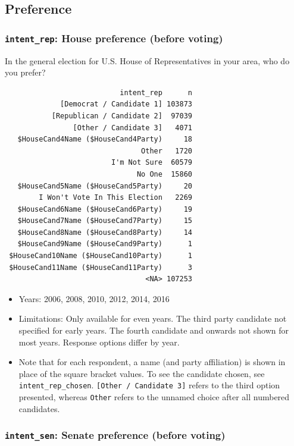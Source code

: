 \documentclass[10pt,article,oneside]{memoir}
\theoremstyle{definition}
\begin{document}
\subsection{Preference}\label{preference}

\subsubsection{\texorpdfstring{\texttt{intent\_rep}: House preference
(before
voting)}{intent\_rep: House preference (before voting)}}\label{intent_rep-house-preference-before-voting}

In the general election for U.S. House of Representatives in your area,
who do you prefer?

\begin{verbatim}
                           intent_rep      n
             [Democrat / Candidate 1] 103873
           [Republican / Candidate 2]  97039
                [Other / Candidate 3]   4071
   $HouseCand4Name ($HouseCand4Party)     18
                                Other   1720
                         I'm Not Sure  60579
                               No One  15860
   $HouseCand5Name ($HouseCand5Party)     20
        I Won't Vote In This Election   2269
   $HouseCand6Name ($HouseCand6Party)     19
   $HouseCand7Name ($HouseCand7Party)     15
   $HouseCand8Name ($HouseCand8Party)     14
   $HouseCand9Name ($HouseCand9Party)      1
 $HouseCand10Name ($HouseCand10Party)      1
 $HouseCand11Name ($HouseCand11Party)      3
                                 <NA> 107253
\end{verbatim}

\begin{itemize}
\tightlist
\item
  Years: 2006, 2008, 2010, 2012, 2014, 2016
\item
  Limitations: Only available for even years. The third party candidate
  not specified for early years. The fourth candidate and onwards not
  shown for most years. Response options differ by year.
\item
  Note that for each respondent, a name (and party affiliation) is shown
  in place of the square bracket values. To see the candidate chosen,
  see \texttt{intent\_rep\_chosen}.
  \texttt{{[}Other\ /\ Candidate\ 3{]}} refers to the third option
  presented, whereas \texttt{Other} refers to the unnamed choice after
  all numbered candidates.
\end{itemize}

\subsubsection{\texorpdfstring{\texttt{intent\_sen}: Senate preference
(before
voting)}{intent\_sen: Senate preference (before voting)}}\label{intent_sen-senate-preference-before-voting}
\end{document}
